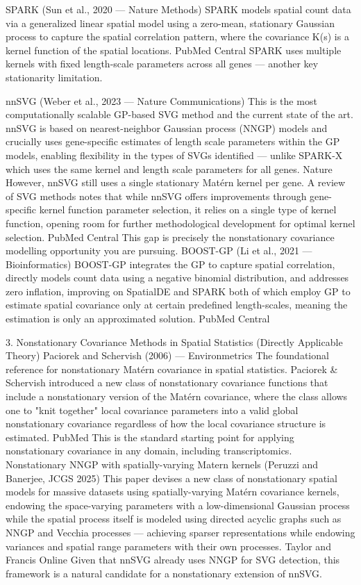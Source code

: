 \documentclass[pdflatex,sn-mathphys-num]{sn-jnl}%
\theoremstyle{thmstyleone}%
\theoremstyle{thmstyletwo}%
\theoremstyle{thmstylethree}%
\begin{document}
SPARK (Sun et al., 2020 — Nature Methods)
SPARK models spatial count data via a generalized linear spatial model using a zero-mean, stationary Gaussian process to capture the spatial correlation pattern, where the covariance K(s) is a kernel function of the spatial locations. PubMed Central SPARK uses multiple kernels with fixed length-scale parameters across all genes — another key stationarity limitation.

nnSVG (Weber et al., 2023 — Nature Communications)
This is the most computationally scalable GP-based SVG method and the current state of the art. nnSVG is based on nearest-neighbor Gaussian process (NNGP) models and crucially uses gene-specific estimates of length scale parameters within the GP models, enabling flexibility in the types of SVGs identified — unlike SPARK-X which uses the same kernel and length scale parameters for all genes. Nature However, nnSVG still uses a single stationary Matérn kernel per gene. A review of SVG methods notes that while nnSVG offers improvements through gene-specific kernel function parameter selection, it relies on a single type of kernel function, opening room for further methodological development for optimal kernel selection. PubMed Central This gap is precisely the nonstationary covariance modelling opportunity you are pursuing.
BOOST-GP (Li et al., 2021 — Bioinformatics)
BOOST-GP integrates the GP to capture spatial correlation, directly models count data using a negative binomial distribution, and addresses zero inflation, improving on SpatialDE and SPARK both of which employ GP to estimate spatial covariance only at certain predefined length-scales, meaning the estimation is only an approximated solution. PubMed Central

3. Nonstationary Covariance Methods in Spatial Statistics (Directly Applicable Theory)
Paciorek and Schervish (2006) — Environmetrics
The foundational reference for nonstationary Matérn covariance in spatial statistics. Paciorek & Schervish introduced a new class of nonstationary covariance functions that include a nonstationary version of the Matérn covariance, where the class allows one to "knit together" local covariance parameters into a valid global nonstationary covariance regardless of how the local covariance structure is estimated. PubMed This is the standard starting point for applying nonstationary covariance in any domain, including transcriptomics.
Nonstationary NNGP with spatially-varying Matern kernels (Peruzzi and Banerjee, JCGS 2025)
This paper devises a new class of nonstationary spatial models for massive datasets using spatially-varying Matérn covariance kernels, endowing the space-varying parameters with a low-dimensional Gaussian process while the spatial process itself is modeled using directed acyclic graphs such as NNGP and Vecchia processes — achieving sparser representations while endowing variances and spatial range parameters with their own processes. Taylor and Francis Online Given that nnSVG already uses NNGP for SVG detection, this framework is a natural candidate for a nonstationary extension of nnSVG.
\end{document}
